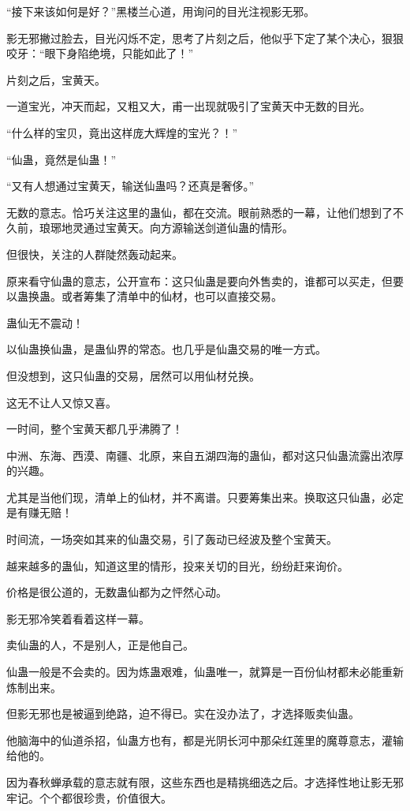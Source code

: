 \begin{this_body}
“接下来该如何是好？”黑楼兰心道，用询问的目光注视影无邪。

影无邪撇过脸去，目光闪烁不定，思考了片刻之后，他似乎下定了某个决心，狠狠咬牙：“眼下身陷绝境，只能如此了！”

片刻之后，宝黄天。

一道宝光，冲天而起，又粗又大，甫一出现就吸引了宝黄天中无数的目光。

“什么样的宝贝，竟出这样庞大辉煌的宝光？！”

“仙蛊，竟然是仙蛊！”

“又有人想通过宝黄天，输送仙蛊吗？还真是奢侈。”

无数的意志。恰巧关注这里的蛊仙，都在交流。眼前熟悉的一幕，让他们想到了不久前，琅琊地灵通过宝黄天。向方源输送剑道仙蛊的情形。

但很快，关注的人群陡然轰动起来。

原来看守仙蛊的意志，公开宣布：这只仙蛊是要向外售卖的，谁都可以买走，但要以蛊换蛊。或者筹集了清单中的仙材，也可以直接交易。

蛊仙无不震动！

以仙蛊换仙蛊，是蛊仙界的常态。也几乎是仙蛊交易的唯一方式。

但没想到，这只仙蛊的交易，居然可以用仙材兑换。

这无不让人又惊又喜。

一时间，整个宝黄天都几乎沸腾了！

中洲、东海、西漠、南疆、北原，来自五湖四海的蛊仙，都对这只仙蛊流露出浓厚的兴趣。

尤其是当他们现，清单上的仙材，并不离谱。只要筹集出来。换取这只仙蛊，必定是有赚无赔！

时间流，一场突如其来的仙蛊交易，引了轰动已经波及整个宝黄天。

越来越多的蛊仙，知道这里的情形，投来关切的目光，纷纷赶来询价。

价格是很公道的，无数蛊仙都为之怦然心动。

影无邪冷笑着看着这样一幕。

卖仙蛊的人，不是别人，正是他自己。

仙蛊一般是不会卖的。因为炼蛊艰难，仙蛊唯一，就算是一百份仙材都未必能重新炼制出来。

但影无邪也是被逼到绝路，迫不得已。实在没办法了，才选择贩卖仙蛊。

他脑海中的仙道杀招，仙蛊方也有，都是光阴长河中那朵红莲里的魔尊意志，灌输给他的。

因为春秋蝉承载的意志就有限，这些东西也是精挑细选之后。才选择性地让影无邪牢记。个个都很珍贵，价值很大。


\end{this_body}

